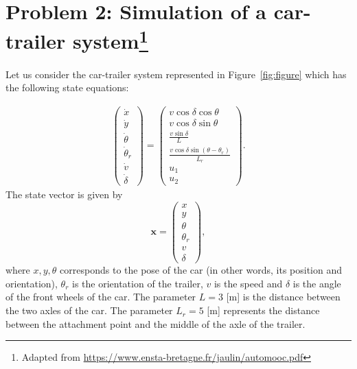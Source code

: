 \documentclass{article}
\begin{document}
\section*{Problem 2: Simulation of a car-trailer system\footnote{Adapted from \href{https://www.ensta-bretagne.fr/jaulin/automooc.pdf}{https://www.ensta-bretagne.fr/jaulin/automooc.pdf}}}




Let us consider the car-trailer system represented in Figure~\ref{fig:figure} which has the following state equations:


\begin{eqnarray*}
\begin{pmatrix}
\dot{x}    \\       
\dot{y}      \\     
\dot{\theta} \\   
\dot{\theta}_r\\ 
\dot{v}           \\
\dot{\delta}   
\end{pmatrix}
=
\begin{pmatrix}
v \cos \delta \cos \theta \\
v \cos \delta \sin \theta\\
\frac{v \sin \delta}{L}\\
\frac{v \cos \delta \sin (\theta -\theta_r)}{L_r}\\
u_1\\
u_2
\end{pmatrix}.
\end{eqnarray*}
The state vector is given by
\begin{equation*}
\mathbf{x} 
=
\begin{pmatrix}
x\\
y\\
\theta\\
\theta_r\\
v\\
\delta
\end{pmatrix},
\end{equation*}
where $x, y, \theta$ corresponds to the pose of the car (in other words, its position and orientation), $\theta_r$ is the orientation of the trailer, $v$ is the speed and $\delta$ is the angle of the front wheels of the car. The
parameter $L = 3$ [m] is the distance between the two axles of the car.
The parameter $L_r = 5$ [m] represents the distance between the
attachment point and the middle of the axle of the trailer.
\end{document}
